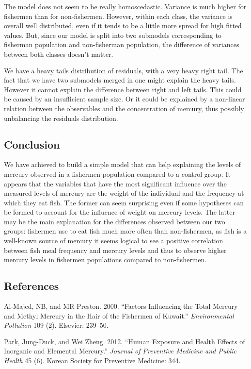 \documentclass[12pt,]{article}
\begin{document}
The model does not seem to be really homoscedastic. Variance is much
higher for fishermen than for non-fishermen. However, within each class,
the variance is overall well distributed, even if it tends to be a
little more spread for high fitted values. But, since our model is split
into two submodels corresponding to fisherman population and
non-fisherman population, the difference of variances between both
classes doesn't matter.

We have a heavy tails distribution of residuals, with a very heavy right
tail. The fact that we have two submodels merged in one might explain
the heavy tails. However it cannot explain the difference between right
and left tails. This could be caused by an insufficient sample size. Or
it could be explained by a non-linear relation between the observables
and the concentration of mercury, thus possibly unbalancing the
residuals distribution.

\subsection{Conclusion}\label{conclusion}

We have achieved to build a simple model that can help explaining the
levels of mercury observed in a fishermen population compared to a
control group. It appears that the variables that have the most
significant influence over the measured levels of mercury are the weight
of the individual and the frequency at which they eat fish. The former
can seem surprising even if some hypotheses can be formed to account for
the influence of weight on mercury levels. The latter may be the main
explanation for the differences observed between our two groups:
fishermen use to eat fish much more often than non-fishermen, as fish is
a well-known source of mercury it seems logical to see a positive
correlation between fish meal frequency and mercury levels and thus to
observe higher mercury levels in fishermen populations compared to
non-fishermen.

\subsection*{References}\label{references}

\hypertarget{refs}{}
\hypertarget{ref-al2000factors}{}
Al-Majed, NB, and MR Preston. 2000. ``Factors Influencing the Total
Mercury and Methyl Mercury in the Hair of the Fishermen of Kuwait.''
\emph{Environmental Pollution} 109 (2). Elsevier: 239--50.

\hypertarget{ref-park2012human}{}
Park, Jung-Duck, and Wei Zheng. 2012. ``Human Exposure and Health
Effects of Inorganic and Elemental Mercury.'' \emph{Journal of
Preventive Medicine and Public Health} 45 (6). Korean Society for
Preventive Medicine: 344.
\end{document}
